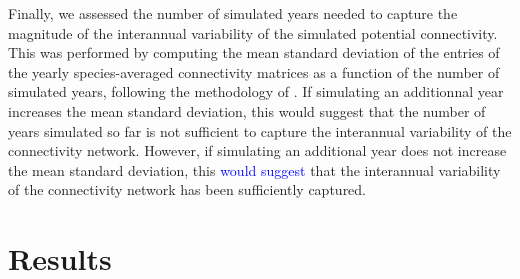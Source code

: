 \documentclass[preprint,12pt,authoryear]{elsarticle}
\newcommand{\modif}[1]{\textcolor{blue}{#1}}
\begin{document}
Finally, we assessed the number of simulated years needed to capture the magnitude of the interannual variability of the simulated potential connectivity. This was performed by computing the mean standard deviation of the entries of the yearly species-averaged connectivity matrices as a function of the number of simulated years, following the methodology of \cite{thompson2018variability}. If simulating an additionnal year increases the mean standard deviation, this would suggest that the number of years simulated so far is not sufficient to capture the interannual variability of the connectivity network. However, if simulating an additional year does not increase the mean standard deviation, this \modif{would suggest} that the interannual variability of the connectivity network has been sufficiently captured.
	
	\section*{Results}
	
\end{document}
